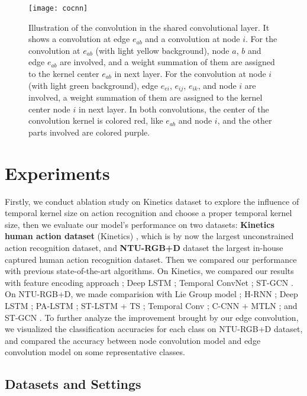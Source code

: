 \documentclass[a4paper,11pt]{article}
\begin{document}
\begin{figure}
\centering
\texttt{[image: cocnn]}
\caption{Illustration of the convolution in the shared convolutional layer. It shows a convolution at edge $e_{ab}$ and a convolution at node $i$. For the convolution at $e_{ab}$ (with light yellow background), node $a$, $b$ and edge $e_{ab}$ are involved, and a weight summation of them are assigned to the kernel center $e_{ab}$ in next layer. For the convolution at node $i$ (with light green background), edge $e_{ei}$, $e_{ij}$, $e_{ik}$, and node $i$ are involved, a weight summation of them are assigned to the kernel center node $i$ in next layer. In both convolutions, the center of the convolution kernel is colored red, like $e_{ab}$ and node $i$, and the other parts involved are colored purple.} 
\label{fig:example}
\end{figure}



\section{Experiments}
Firstly, we conduct ablation study on Kinetics dataset to explore the influence of temporal kernel size on action recognition and choose a proper temporal kernel size, then we evaluate our model's performance on two datasets: {\bf Kinetics human action dataset} (Kinetics) \cite{kay2017kinetics}, which is by now the largest unconstrained action recognition dataset, and {\bf NTU-RGB+D} dataset \cite{shahroudy2016ntu} the largest in-house captured human action recognition dataset. Then we compared our performance with previous state-of-the-art algorithms. On Kinetics, we compared our results with feature encoding approach \cite{fernando2015modeling}; Deep LSTM \cite{shahroudy2016ntu}; Temporal ConvNet \cite{soo2017interpretable}; ST-GCN \cite{yan2018spatial}. On NTU-RGB+D, we made comparision with Lie Group model \cite{vemulapalli2014human}; H-RNN \cite{du2015hierarchical}; Deep LSTM \cite{shahroudy2016ntu}; PA-LSTM \cite{shahroudy2016ntu}; ST-LSTM + TS \cite{liu2016spatio}; Temporal Conv \cite{soo2017interpretable}; C-CNN + MTLN \cite{ke2017new}; and ST-GCN \cite{yan2018spatial}. To further analyze the improvement brought by our edge convolution, we visualized the classification accuracies for each class on NTU-RGB+D dataset, and compared the accuracy between node convolution model and edge convolution model on some representative classes.
\subsection{Datasets and Settings}
\end{document}
